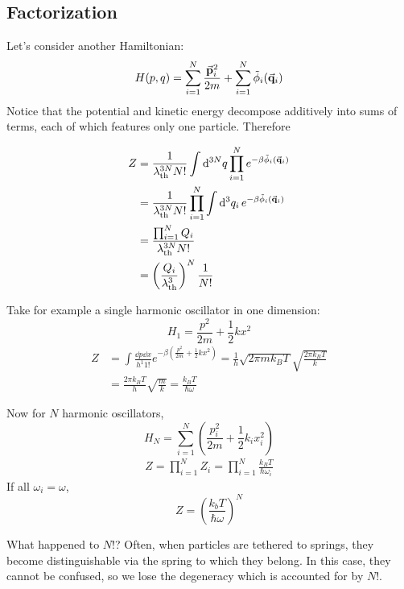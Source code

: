 \documentclass[a4paper,twoside,master.tex]{subfiles}
\begin{document}
\subsection{Factorization}
\label{sub:factorization}
Let's consider another Hamiltonian:
\begin{equation}
    H(p,q) = \sum_{i=1}^{N} \frac{\va{p}_i^2}{2m} + \sum_{i=1}^{N} \tilde{\phi}_i(\va{q}_i) 
\end{equation}
Notice that the potential and kinetic energy decompose additively into sums of terms, each of which features only one particle. Therefore

\begin{align}
    Z &= \frac{1}{\lambda^{3N}_{\text{th}} N!} \int \dd[3N]{q} \prod_{i=1}^{N} e^{- \beta \tilde{\phi}_i(\va{q}_i)} \\
    &= \frac{1}{\lambda^{3N}_{\text{th}} N!} \prod_{i=1}^{N} \int \dd[3]{q_i} e^{- \beta \tilde{\phi}_i(\va{q}_i)} \\
    &= \frac{\prod_{i=1}^{N} Q_i}{\lambda_{\text{th}}^{3N} N!} \\
    &= \left( \frac{Q_i}{\lambda_{\text{th}}^3} \right)^N \frac{1}{N!}
\end{align}

\begin{ex}
    Take for example a single harmonic oscillator in one dimension:
    \begin{equation}
        H_1 = \frac{p^2}{2m} + \frac{1}{2} k x^2
    \end{equation}
    \begin{align}
        Z &= \int \frac{\dd{p} \dd{x}}{h^1 1!} e^{- \beta \left( \frac{p^2}{2m} + \frac{1}{2} kx^2 \right)} = \frac{1}{h} \sqrt{2 \pi m k_B T} \sqrt{\frac{2 \pi k_B T}{k}} \\
        &= \frac{2 \pi k_B T}{h} \sqrt{\frac{m}{k}} = \frac{k_B T}{\hbar \omega}
    \end{align}

    Now for $ N $ harmonic oscillators,
    \begin{equation}
        H_N = \sum_{i=1}^{N} \left( \frac{p_i^2}{2m} + \frac{1}{2} k_i x_i^2 \right)
    \end{equation}
    \begin{align}
        Z = \prod_{i=1}^{N} Z_i = \prod_{i=1}^{N} \frac{k_B T}{\hbar \omega_i}
    \end{align}
    If all $ \omega_i = \omega $,
    \begin{equation}
        Z = \left( \frac{k_b T}{\hbar \omega} \right)^N
    \end{equation}

    What happened to $ N! $? Often, when particles are tethered to springs, they become distinguishable via the spring to which they belong. In this case, they cannot be confused, so we lose the degeneracy which is accounted for by $ N! $.
\end{ex}
\end{document}
